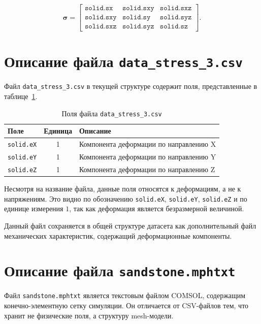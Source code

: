 \begin{equation}
\boldsymbol{\sigma}=\begin{bmatrix}
\texttt{solid.sx} & \texttt{solid.sxy} & \texttt{solid.sxz} \\
\texttt{solid.sxy} & \texttt{solid.sy} & \texttt{solid.syz} \\
\texttt{solid.sxz} & \texttt{solid.syz} & \texttt{solid.sz}
\end{bmatrix}.
\end{equation}

\section{Описание файла \texttt{data\_stress\_3.csv}}

Файл \texttt{data\_stress\_3.csv} в текущей структуре содержит поля, представленные в таблице~\ref{tab:data_stress_3}.

\begin{table}[h!]
\centering
\caption{Поля файла \texttt{data\_stress\_3.csv}}
\label{tab:data_stress_3}
\begin{tabular}{|l|c|p{8cm}|}
\hline
\textbf{Поле} & \textbf{Единица} & \textbf{Описание} \\
\hline
\texttt{solid.eX} & 1 & Компонента деформации по направлению X \\
\hline
\texttt{solid.eY} & 1 & Компонента деформации по направлению Y \\
\hline
\texttt{solid.eZ} & 1 & Компонента деформации по направлению Z \\
\hline
\end{tabular}
\end{table}

Несмотря на название файла, данные поля относятся к деформациям, а не к напряжениям. Это видно по обозначению \texttt{solid.eX}, \texttt{solid.eY}, \texttt{solid.eZ} и по единице измерения $1$, так как деформация является безразмерной величиной.

Данный файл сохраняется в общей структуре датасета как дополнительный файл механических характеристик, содержащий деформационные компоненты.

\section{Описание файла \texttt{sandstone.mphtxt}}

Файл \texttt{sandstone.mphtxt} является текстовым файлом COMSOL, содержащим конечно-элементную сетку симуляции. Он отличается от CSV-файлов тем, что хранит не физические поля, а структуру mesh-модели.

